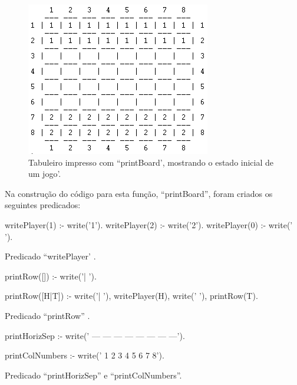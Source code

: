 \documentclass[15pt,a4paper]{article}
\begin{document}
\begin{figure}[h!]
\begin{center}
\includegraphics[scale=1]{fig_tab.png}
\caption{Tabuleiro impresso com ``printBoard', mostrando o estado inicial de um jogo'.}
\label{fig:3}
\end{center}
\end{figure}

Na construção do código para esta função, ``printBoard'', foram criados os seguintes predicados:

\begin{code}[H]
	\begin{verbatimtab}

writePlayer(1) :-
	write('1').
writePlayer(2) :-
	write('2').
writePlayer(0) :-
	write(' ').
\end{verbatimtab}
\caption{Predicado ``writePlayer' .}
\end{code}



\begin{code}[H]
	\begin{verbatimtab}

printRow([])    :- 
	write('| ').

printRow([H|T]) :-
	write('| '),
	writePlayer(H),
	write(' '),
	printRow(T).
\end{verbatimtab}
\caption{Predicado ``printRow'' .}
\end{code}



\begin{code}[H]
	\begin{verbatimtab}

printHorizSep   :-
	write('   --- --- --- --- --- --- --- ---').

printColNumbers :-
	write('    1   2   3   4   5   6   7   8').
\end{verbatimtab}
\caption{Predicado ``printHorizSep'' e ``printColNumbers''.}
\end{code}
\end{document}
